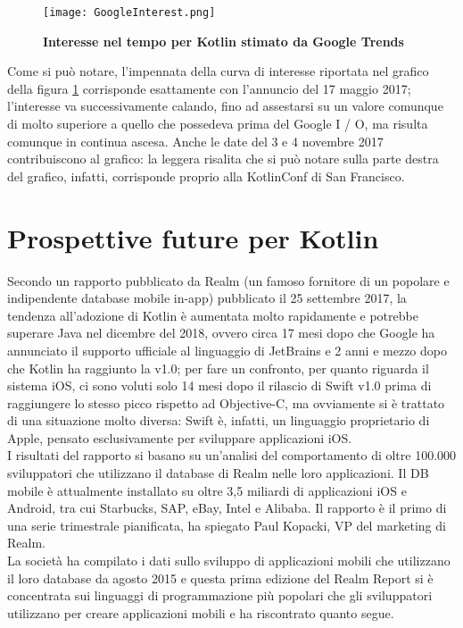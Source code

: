 \begin{figure}[ht]
  \centering
  \texttt{[image: GoogleInterest.png]}
  \caption{{\bfseries Interesse nel tempo per Kotlin stimato da Google Trends}}
  \label{GoogleInterest}
\end{figure}

Come si può notare, l'impennata della curva di interesse riportata nel grafico della figura \ref{GoogleInterest} corrisponde esattamente con l'annuncio del 17 maggio 2017; l'interesse va successivamente calando, fino ad assestarsi su un valore comunque di molto superiore a quello che possedeva prima del Google I / O, ma risulta comunque in continua ascesa. Anche le date del 3 e 4 novembre 2017 contribuiscono al grafico: la leggera risalita che si può notare sulla parte destra del grafico, infatti, corrisponde proprio alla KotlinConf di San Francisco.\\

\section{Prospettive future per Kotlin}

Secondo un rapporto \cite{realmReport} pubblicato da Realm \cite{realm} (un famoso fornitore di un popolare e indipendente database mobile in-app) pubblicato il 25 settembre 2017, la tendenza all'adozione di Kotlin è aumentata molto rapidamente e potrebbe superare Java nel dicembre del 2018, ovvero circa 17 mesi dopo che Google ha annunciato il supporto ufficiale al linguaggio di JetBrains e 2 anni e mezzo dopo che Kotlin ha raggiunto la v1.0; per fare un confronto, per quanto riguarda il sistema iOS, ci sono voluti solo 14 mesi dopo il rilascio di Swift v1.0 prima di raggiungere lo stesso picco rispetto ad Objective-C, ma ovviamente si è trattato di una situazione molto diversa: Swift è, infatti, un linguaggio proprietario di Apple, pensato esclusivamente per sviluppare applicazioni iOS.\\

I risultati del rapporto si basano su un'analisi del comportamento di oltre 100.000 sviluppatori che utilizzano il database di Realm nelle loro applicazioni. Il DB mobile è attualmente installato su oltre 3,5 miliardi di applicazioni iOS e Android, tra cui Starbucks, SAP, eBay, Intel e Alibaba. Il rapporto è il primo di una serie trimestrale pianificata, ha spiegato Paul Kopacki, VP del marketing di Realm.\\
La società ha compilato i dati sullo sviluppo di applicazioni mobili che utilizzano il loro database da agosto 2015 e questa prima edizione del Realm Report si è concentrata sui linguaggi di programmazione più popolari che gli sviluppatori utilizzano per creare applicazioni mobili e ha riscontrato quanto segue.\\

